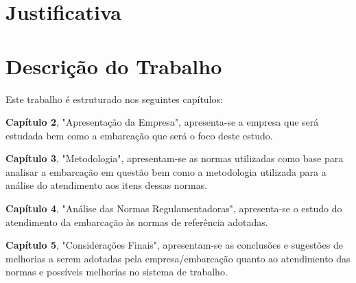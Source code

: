 \documentclass[../main.tex]{subfiles}
\begin{document}
\section{Justificativa}

\section{Descrição do Trabalho}
Este trabalho é estruturado nos seguintes capítulos:

\textbf{Capítulo 2}, "Apresentação da Empresa", apresenta-se a empresa que será estudada bem como a embarcação que será o foco deste estudo.

\textbf{Capítulo 3}, "Metodologia", apresentam-se as normas utilizadas como base para analisar a embarcação em questão bem como a  metodologia utilizada para a análise do atendimento aos itens dessas normas. 

\textbf{Capítulo 4}, "Análise das Normas Regulamentadoras", apresenta-se o estudo do atendimento da embarcação às normas de referência adotadas. 

\textbf{Capítulo 5}, "Considerações Finais",  apresentam-se as conclusões e sugestões de melhorias a serem adotadas pela empresa/embarcação quanto ao atendimento das normas e possíveis melhorias no sistema de trabalho.
\end{document}
